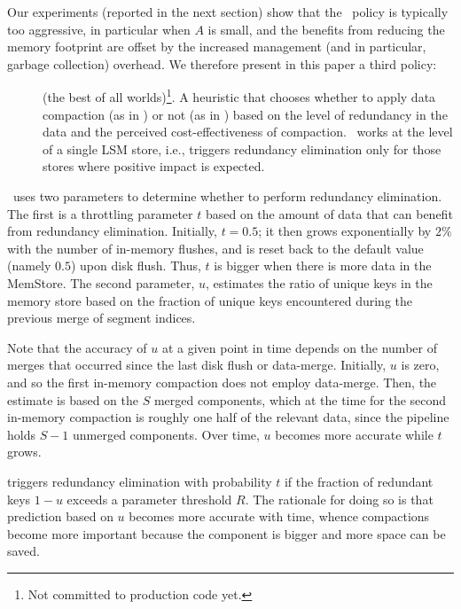 Our experiments (reported in the next section) show that the \eager\ policy is typically too aggressive, in particular when $A$ is small,
and the benefits from reducing the memory footprint are offset by the increased management (and in particular, garbage collection) overhead.
We therefore present in this paper a third policy:
\begin{description}
\item[\adp] (the best of all worlds)\footnote{\small{Not committed to production code yet.}}. A heuristic that chooses 
whether to apply data compaction (as in \eager) or not (as in \basic) based on the level of redundancy in the data 
and the perceived cost-effectiveness of compaction. \adp\ works at the level of a single LSM store, i.e., triggers 
redundancy elimination only for those stores where positive impact is expected. 
\end{description}

\adp\ uses two parameters to determine whether to perform redundancy elimination.
The first is a throttling parameter $t$ based on the amount of data that can benefit from redundancy elimination. 
Initially, $t=0.5$; it then grows exponentially by $2\%$ with the number of in-memory flushes, and is reset back to 
the default value (namely $0.5$) upon disk flush. Thus, $t$ is bigger when there is more data in the MemStore.
The second parameter, $u$, estimates the ratio of unique keys in the memory store based on the 
fraction of unique keys encountered during the previous merge of segment indices. 

Note that the accuracy of $u$ at a given point in time depends on the number of merges that occurred since the last disk flush
or data-merge.
Initially, $u$ is zero, and so the first in-memory compaction does not employ data-merge.
Then, the estimate is based on the $S$ merged components, which at the time for the second in-memory compaction
is roughly one half of the relevant data, since the pipeline holds $S-1$ unmerged components. 
Over time, $u$ becomes more accurate while $t$ grows. 

\adp\/ triggers redundancy elimination with probability $t$ if the fraction of redundant keys $1-u$ exceeds a parameter 
threshold $R$. The rationale for doing so is that prediction based on $u$ becomes more accurate with time, whence 
compactions become more important because the component is bigger and more space can be saved.


